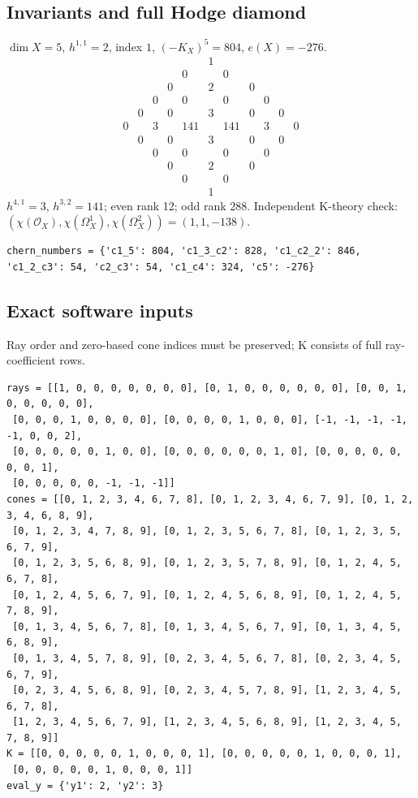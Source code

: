 \documentclass[10pt,a4paper]{article}
\begin{document}
\subsection*{Invariants and full Hodge diamond}
$\dim X=5$, $h^{1,1}=2$, index $1$, $(-K_X)^5=804$, $e(X)=-276$.
\[\begin{array}{ccccccccccc}&&&&&1&&&&&\\&&&&0&&0&&&&\\&&&0&&2&&0&&&\\&&0&&0&&0&&0&&\\&0&&0&&3&&0&&0&\\0&&3&&141&&141&&3&&0\\&0&&0&&3&&0&&0&\\&&0&&0&&0&&0&&\\&&&0&&2&&0&&&\\&&&&0&&0&&&&\\&&&&&1&&&&&\end{array}\]
$h^{4,1}=3$, $h^{3,2}=141$; even rank 12; odd rank 288.
Independent K-theory check: $(\chi(\mathcal O_X),\chi(\Omega_X^1),\chi(\Omega_X^2))=(1, 1, -138)$.
\begin{lstlisting}
chern_numbers = {'c1_5': 804, 'c1_3_c2': 828, 'c1_c2_2': 846, 'c1_2_c3': 54, 'c2_c3': 54, 'c1_c4': 324, 'c5': -276}
\end{lstlisting}
\subsection*{Exact software inputs}
Ray order and zero-based cone indices must be preserved; K consists of full ray-coefficient rows.
\begin{lstlisting}
rays = [[1, 0, 0, 0, 0, 0, 0, 0], [0, 1, 0, 0, 0, 0, 0, 0], [0, 0, 1, 0, 0, 0, 0, 0],
 [0, 0, 0, 1, 0, 0, 0, 0], [0, 0, 0, 0, 1, 0, 0, 0], [-1, -1, -1, -1, -1, 0, 0, 2],
 [0, 0, 0, 0, 0, 1, 0, 0], [0, 0, 0, 0, 0, 0, 1, 0], [0, 0, 0, 0, 0, 0, 0, 1],
 [0, 0, 0, 0, 0, -1, -1, -1]]
cones = [[0, 1, 2, 3, 4, 6, 7, 8], [0, 1, 2, 3, 4, 6, 7, 9], [0, 1, 2, 3, 4, 6, 8, 9],
 [0, 1, 2, 3, 4, 7, 8, 9], [0, 1, 2, 3, 5, 6, 7, 8], [0, 1, 2, 3, 5, 6, 7, 9],
 [0, 1, 2, 3, 5, 6, 8, 9], [0, 1, 2, 3, 5, 7, 8, 9], [0, 1, 2, 4, 5, 6, 7, 8],
 [0, 1, 2, 4, 5, 6, 7, 9], [0, 1, 2, 4, 5, 6, 8, 9], [0, 1, 2, 4, 5, 7, 8, 9],
 [0, 1, 3, 4, 5, 6, 7, 8], [0, 1, 3, 4, 5, 6, 7, 9], [0, 1, 3, 4, 5, 6, 8, 9],
 [0, 1, 3, 4, 5, 7, 8, 9], [0, 2, 3, 4, 5, 6, 7, 8], [0, 2, 3, 4, 5, 6, 7, 9],
 [0, 2, 3, 4, 5, 6, 8, 9], [0, 2, 3, 4, 5, 7, 8, 9], [1, 2, 3, 4, 5, 6, 7, 8],
 [1, 2, 3, 4, 5, 6, 7, 9], [1, 2, 3, 4, 5, 6, 8, 9], [1, 2, 3, 4, 5, 7, 8, 9]]
K = [[0, 0, 0, 0, 0, 1, 0, 0, 0, 1], [0, 0, 0, 0, 0, 1, 0, 0, 0, 1],
 [0, 0, 0, 0, 0, 1, 0, 0, 0, 1]]
eval_y = {'y1': 2, 'y2': 3}
\end{lstlisting}
\end{document}
